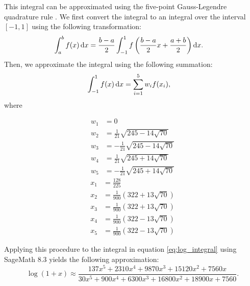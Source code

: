 This integral can be approximated using the five-point Gauss-Legendre quadrature rule \cite{kythe_quadrature_2002}. We first convert the integral to an integral over the interval $[-1,1]$ using the following transformation:
\begin{align*}
	\int_a^b{f(x)\mathop{}\!\mathrm{d} x}
	&= \frac{b-a}{2}\int_{-1}^{1}{f\left(\frac{b-a}{2}x+\frac{a+b}{2}\right)\mathop{}\!\mathrm{d} x}.
\end{align*}
Then, we approximate the integral using the following summation:
\begin{align*}
  \int_{-1}^{1}{f(x)\mathop{}\!\mathrm{d} x} &= \sum_{i=1}^{5}{w_if(x_i)},
\end{align*}
where
\begin{multicols}{2}
	\noindent
	\begin{align*}
		w_1 &= 0\\
		w_2 &= \frac{1}{21}\sqrt{245-14\sqrt{70}}\\
		w_3 &= -\frac{1}{21}\sqrt{245-14\sqrt{70}}\\
		w_4 &= \frac{1}{21}\sqrt{245+14\sqrt{70}}\\
		w_5 &= -\frac{1}{21}\sqrt{245+14\sqrt{70}}
	\end{align*}
	\columnbreak
	\begin{align*}
		x_1 &= \frac{128}{225}\\
		x_2 &= \frac{1}{900}\left( 322 + 13\sqrt{70}\right)\\
		x_3 &= \frac{1}{900}\left( 322 + 13\sqrt{70}\right)\\
		x_4 &= \frac{1}{900}\left( 322 - 13\sqrt{70}\right)\\
		x_5 &= \frac{1}{900}\left( 322 - 13\sqrt{70}\right)
	\end{align*}
\end{multicols}
Applying this procedure to the integral in equation \ref{eq:log_integral} using SageMath 8.3 yields the following approximation:
\begin{equation}\label{eq:standardquadrature}
  \log(1+x) \approx
  \frac{137x^5 + 2310x^4 + 9870x^3 + 15120x^2 + 7560x}
  {30x^5 + 900x^4 + 6300x^3 + 16800x^2 + 18900x + 7560}.
\end{equation}

